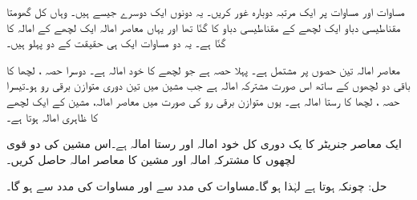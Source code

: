 مساوات  اور مساوات   پر ایک مرتبہ دوبارہ غور کریں۔ یہ دونوں ایک دوسرے جیسے ہیں۔ وہاں کل گھومتا مقناطیسی دباو ایک لچھے کے مقناطیسی دباو کا   گنّا تھا اور یہاں معاصر امالہ ایک لچھے کے امالہ کا  گنّا ہے۔ یہ دو مساوات  ایک ہی حقیقت کے دو پہلو ہیں۔

معاصر امالہ تین حصوں پر مشتمل ہے۔ پہلا حصہ  ہے جو  لچھے کا خود امالہ ہے۔ دوسرا حصہ ،  لچھا   کا باقی دو لچھوں کے ساتھ اس صورت  مشترکہ امالہ ہے جب مشین میں تین دوری متوازن برقی رو ہو۔تیسرا حصہ ،  لچھا   کا رستا امالہ ہے۔ یوں متوازن برقی رو کی صورت میں معاصر امالہ،  مشین کے ایک لچھے کا ظاہری امالہ ہوتا ہے۔

ایک معاصر جنریٹر کا یک دوری  کل خود امالہ  اور رستا امالہ  ہے۔اس مشین کی دو قوی لچھوں  کا  مشترکہ امالہ اور مشین کا معاصر امالہ حاصل کریں۔

حل:\quad
چونکہ  ہوتا ہے   لہٰذا  ہو گا۔مساوات   کی مدد سے   اور مساوات   کی مدد سے   ہو گا۔
%

